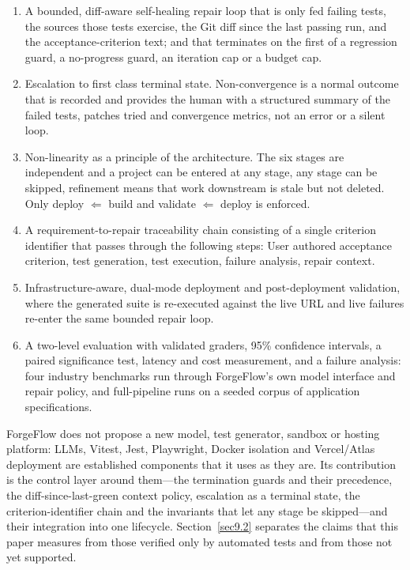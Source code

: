 \documentclass[pdflatex,sn-mathphys-num]{sn-jnl}%
\theoremstyle{thmstyleone}%
\theoremstyle{thmstyletwo}%
\theoremstyle{thmstylethree}%
\begin{document}
\begin{enumerate}
\item A bounded, diff-aware self-healing repair loop that is only fed failing tests, the sources those tests exercise, the Git diff since the last passing run, and the acceptance-criterion text; and that terminates on the first of a regression guard, a no-progress guard, an iteration cap or a budget cap.
\item Escalation to first class terminal state. Non-convergence is a normal outcome that is recorded and provides the human with a structured summary of the failed tests, patches tried and convergence metrics, not an error or a silent loop.
\item Non-linearity as a principle of the architecture. The six stages are independent and a project can be entered at any stage, any stage can be skipped, refinement means that work downstream is stale but not deleted. Only deploy $\Leftarrow$ build and validate $\Leftarrow$ deploy is enforced.
\item A requirement-to-repair traceability chain consisting of a single criterion identifier that passes through the following steps: User authored acceptance criterion, test generation, test execution, failure analysis, repair context.
\item Infrastructure-aware, dual-mode deployment and post-deployment validation, where the generated suite is re-executed against the live URL and live failures re-enter the same bounded repair loop.
\item A two-level evaluation with validated graders, 95\% confidence intervals, a paired significance test, latency and cost measurement, and a failure analysis: four industry benchmarks run through ForgeFlow's own model interface and repair policy, and full-pipeline runs on a seeded corpus of application specifications.
\end{enumerate}

ForgeFlow does not propose a new model, test generator, sandbox or hosting platform: LLMs, Vitest, Jest, Playwright, Docker isolation and Vercel/Atlas deployment are established components that it uses as they are. Its contribution is the control layer around them---the termination guards and their precedence, the diff-since-last-green context policy, escalation as a terminal state, the criterion-identifier chain and the invariants that let any stage be skipped---and their integration into one lifecycle. Section~\ref{sec9.2} separates the claims that this paper measures from those verified only by automated tests and from those not yet supported.%
\end{document}
